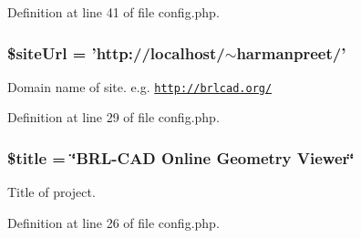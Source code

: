 Definition at line 41 of file config.\-php.

\hypertarget{config_8php_a249f6872029172ca47702c3b887aed34}{
\subsubsection[{\$site\-Url}]{\setlength{\rightskip}{0pt plus 5cm}\$site\-Url = 'http\-://localhost/$\sim$harmanpreet/'}}\label{config_8php_a249f6872029172ca47702c3b887aed34}
Domain name of site. e.\-g. \href{http://brlcad.org/}{\tt http\-://brlcad.\-org/} 

Definition at line 29 of file config.\-php.

\hypertarget{config_8php_ada57e7bb7c152edad18fe2f166188691}{
\subsubsection[{\$title}]{\setlength{\rightskip}{0pt plus 5cm}\$title = \char`\"{}B\-R\-L-\/C\-A\-D Online Geometry Viewer\char`\"{}}}\label{config_8php_ada57e7bb7c152edad18fe2f166188691}
Title of project. 

Definition at line 26 of file config.\-php.

